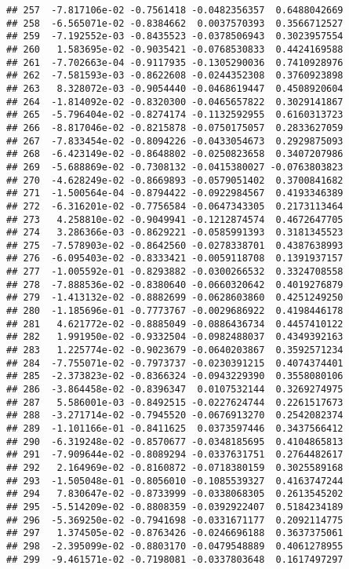\documentclass[
]{article}
\begin{document}
\begin{verbatim}
## 257  -7.817106e-02 -0.7561418 -0.0482356357  0.6488042669
## 258  -6.565071e-02 -0.8384662  0.0037570393  0.3566712527
## 259  -7.192552e-03 -0.8435523 -0.0378506943  0.3023957554
## 260   1.583695e-02 -0.9035421 -0.0768530833  0.4424169588
## 261  -7.702663e-04 -0.9117935 -0.1305290036  0.7410928976
## 262  -7.581593e-03 -0.8622608 -0.0244352308  0.3760923898
## 263   8.328072e-03 -0.9054440 -0.0468619447  0.4508920604
## 264  -1.814092e-02 -0.8320300 -0.0465657822  0.3029141867
## 265  -5.796404e-02 -0.8274174 -0.1132592955  0.6160313723
## 266  -8.817046e-02 -0.8215878 -0.0750175057  0.2833627059
## 267  -7.833454e-02 -0.8094226 -0.0433054673  0.2929875093
## 268  -6.423149e-02 -0.8648802 -0.0250823658  0.3407207986
## 269  -5.688869e-02 -0.7308132 -0.0415380027 -0.0763803823
## 270  -4.628249e-02 -0.8669893 -0.0579051402  0.3700841682
## 271  -1.500564e-04 -0.8794422 -0.0922984567  0.4193346389
## 272  -6.316201e-02 -0.7756584 -0.0647343305  0.2173113464
## 273   4.258810e-02 -0.9049941 -0.1212874574  0.4672647705
## 274   3.286366e-03 -0.8629221 -0.0585991393  0.3181345523
## 275  -7.578903e-02 -0.8642560 -0.0278338701  0.4387638993
## 276  -6.095403e-02 -0.8333421 -0.0059118708  0.1391937157
## 277  -1.005592e-01 -0.8293882 -0.0300266532  0.3324708558
## 278  -7.888536e-02 -0.8380640 -0.0660320642  0.4019276879
## 279  -1.413132e-02 -0.8882699 -0.0628603860  0.4251249250
## 280  -1.185696e-01 -0.7773767 -0.0029686922  0.4198446178
## 281   4.621772e-02 -0.8885049 -0.0886436734  0.4457410122
## 282   1.991950e-02 -0.9332504 -0.0982488037  0.4349392163
## 283   1.225774e-02 -0.9023679 -0.0640203867  0.3592571234
## 284  -7.755071e-02 -0.7973737 -0.0230391215  0.4074374401
## 285  -2.373823e-02 -0.8366324 -0.0943229390  0.3558080106
## 286  -3.864458e-02 -0.8396347  0.0107532144  0.3269274975
## 287   5.586001e-03 -0.8492515 -0.0227624744  0.2261517673
## 288  -3.271714e-02 -0.7945520 -0.0676913270  0.2542082374
## 289  -1.101166e-01 -0.8411625  0.0373597446  0.3437566412
## 290  -6.319248e-02 -0.8570677 -0.0348185695  0.4104865813
## 291  -7.909644e-02 -0.8089294 -0.0337631751  0.2764482617
## 292   2.164969e-02 -0.8160872 -0.0718380159  0.3025589168
## 293  -1.505048e-01 -0.8056010 -0.1085539327  0.4163747244
## 294   7.830647e-02 -0.8733999 -0.0338068305  0.2613545202
## 295  -5.514209e-02 -0.8808359 -0.0392922407  0.5184234189
## 296  -5.369250e-02 -0.7941698 -0.0331671177  0.2092114775
## 297   1.374505e-02 -0.8763426 -0.0246696188  0.3637375061
## 298  -2.395099e-02 -0.8803170 -0.0479548889  0.4061278955
## 299  -9.461571e-02 -0.7198081 -0.0337803648  0.1617497297

\end{verbatim}
\end{document}
